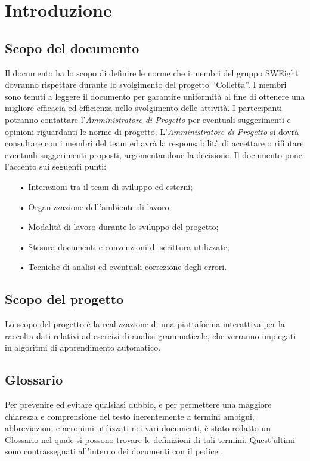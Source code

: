 \section{Introduzione}
\subsection{Scopo del documento}
Il documento ha lo scopo di definire le norme che i membri del gruppo SWEight dovranno rispettare durante lo svolgimento del progetto “Colletta”. 
I membri sono tenuti a leggere il documento per garantire uniformità al fine di ottenere una migliore efficacia ed efficienza nello svolgimento delle attività. I partecipanti potranno contattare l'\textit{Amministratore di Progetto} per eventuali suggerimenti e opinioni riguardanti le norme di progetto. 
L'\textit{Amministratore di Progetto} si dovrà consultare con i membri del team ed avrà la responsabilità di accettare o rifiutare eventuali suggerimenti proposti, argomentandone la decisione.
Il documento pone l'accento sui seguenti punti:
\begin{itemize}
\item[•] Interazioni tra il team di sviluppo ed esterni;
\item[•] Organizzazione dell'ambiente di lavoro;
\item[•] Modalità di lavoro durante lo sviluppo del progetto;
\item[•] Stesura documenti e convenzioni di scrittura utilizzate;
\item[•] Tecniche di analisi ed eventuali correzione degli errori.
\end{itemize}
\subsection{Scopo del progetto}
Lo scopo del progetto è la realizzazione di una piattaforma interattiva per la raccolta dati relativi ad esercizi di analisi grammaticale, che verranno impiegati in algoritmi di apprendimento automatico. %
\subsection{Glossario}
Per prevenire ed evitare qualsiasi dubbio, e per permettere una maggiore chiarezza e comprensione del testo inerentemente a termini ambigui, abbreviazioni e acronimi utilizzati nei vari documenti, è stato redatto un Glossario nel quale si possono trovare le definizioni di tali termini. Quest'ultimi sono contrassegnati all'interno dei documenti con il pedice .
